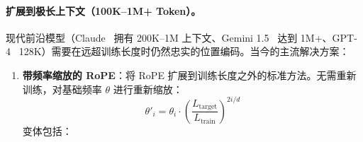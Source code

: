 \paragraph{扩展到极长上下文（100K--1M+ Token）。}
\label{scaling-to-extremely-long-contexts-100k1m-tokens.}

现代前沿模型（Claude~\cite{anthropic2024claude3} 拥有 200K--1M 上下文、Gemini 1.5~\cite{geminiteam2024gemini15} 达到 1M+、GPT-4~\cite{openai2023gpt4} 128K）需要在远超训练长度时仍然忠实的位置编码。当今的主流解决方案：

\begin{enumerate}
  \item \textbf{带频率缩放的 RoPE}：将 RoPE 扩展到训练长度之外的标准方法。无需重新训练，对基础频率 $\theta$ 进行重新缩放：
\[
\theta'_i = \theta_i \cdot \left(\frac{L_{\text{target}}}{L_{\text{train}}}\right)^{2i/d}
\]
变体包括：


\end{enumerate}
